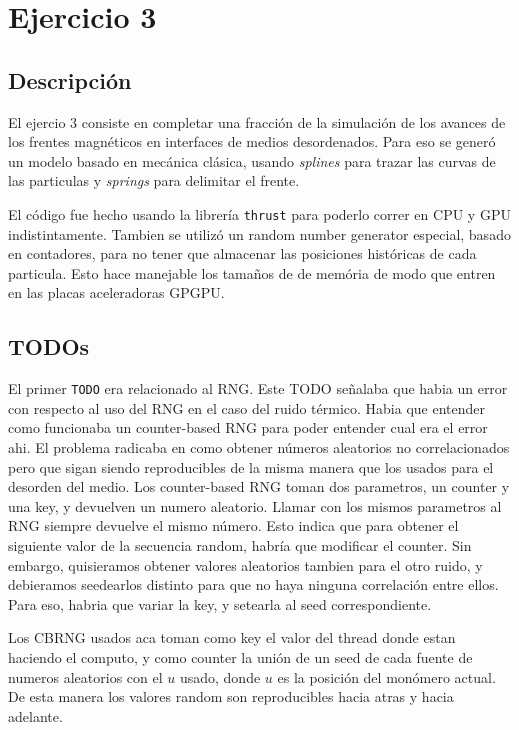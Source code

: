 \section{Ejercicio 3}

\subsection{Descripci\'on}
El ejercio 3 consiste en completar una fracci\'on de la simulaci\'on de los avances de los frentes magn\'eticos
en interfaces de medios desordenados. Para eso se gener\'o un modelo basado en mec\'anica cl\'asica, usando
\textit{splines} para trazar las curvas de las particulas y \textit{springs} para delimitar el frente.

El c\'odigo fue hecho usando la librer\'ia \texttt{thrust} para poderlo correr en CPU y GPU indistintamente.
Tambien se utiliz\'o un random number generator especial, basado en contadores, para no tener que almacenar las posiciones 
hist\'oricas de cada particula. Esto hace manejable los tama\~nos de de mem\'oria de modo que entren en las placas
aceleradoras GPGPU. 

\subsection{TODOs}
El primer \texttt{TODO} era relacionado al RNG. Este TODO se\~nalaba que habia un error con respecto al
uso del RNG en el caso del ruido t\'ermico. Habia que entender como funcionaba un counter-based RNG para
poder entender cual era el error ahi. El problema radicaba en como obtener n\'umeros aleatorios no correlacionados
pero que sigan siendo reproducibles de la misma manera que los usados para el desorden del medio. 
Los counter-based RNG toman dos parametros, un counter y una key, y devuelven un numero aleatorio. Llamar
con los mismos parametros al RNG siempre devuelve el mismo n\'umero. Esto indica que para obtener 
el siguiente valor de la secuencia random, habr\'ia que modificar el counter. Sin embargo, quisieramos
obtener valores aleatorios tambien para el otro ruido, y debieramos seedearlos distinto para que no
haya ninguna correlaci\'on entre ellos. Para eso, habria que variar la key, y setearla al seed correspondiente.

Los CBRNG usados aca toman como key el valor del thread donde estan haciendo el computo, y como counter 
la uni\'on de un seed de cada fuente de numeros aleatorios con el $u$ usado, donde $u$ es la posici\'on del mon\'omero
actual. De esta manera los valores random son reproducibles hacia atras y hacia adelante.

